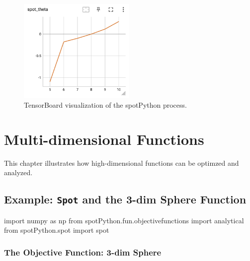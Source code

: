 \documentclass[
  letterpaper,
  DIV=11,
  numbers=noendperiod]{scrreprt}
\newenvironment{Shaded}{\begin{snugshade}}{\end{snugshade}}
\newcommand{\ImportTok}[1]{\textcolor[rgb]{0.00,0.46,0.62}{#1}}
\newcommand{\NormalTok}[1]{\textcolor[rgb]{0.00,0.23,0.31}{#1}}
\begin{document}
\begin{figure}

{\centering \includegraphics[width=0.5\textwidth,height=\textheight]{figures_static/01_tensorboard_03.png}

}

\caption{TensorBoard visualization of the spotPython process.}

\end{figure}

\hypertarget{sec-multi-dim}{%
\chapter{Multi-dimensional Functions}\label{sec-multi-dim}}

This chapter illustrates how high-dimensional functions can be optimzed
and analyzed.

\hypertarget{example-spot-and-the-3-dim-sphere-function}{%
\section{\texorpdfstring{Example: \texttt{Spot} and the 3-dim Sphere
Function}{Example: Spot and the 3-dim Sphere Function}}\label{example-spot-and-the-3-dim-sphere-function}}

\begin{Shaded}
\begin{Highlighting}[]
\ImportTok{import}\NormalTok{ numpy }\ImportTok{as}\NormalTok{ np}
\ImportTok{from}\NormalTok{ spotPython.fun.objectivefunctions }\ImportTok{import}\NormalTok{ analytical}
\ImportTok{from}\NormalTok{ spotPython.spot }\ImportTok{import}\NormalTok{ spot}
\end{Highlighting}
\end{Shaded}

\hypertarget{the-objective-function-3-dim-sphere}{%
\subsection{The Objective Function: 3-dim
Sphere}\label{the-objective-function-3-dim-sphere}}
\end{document}
